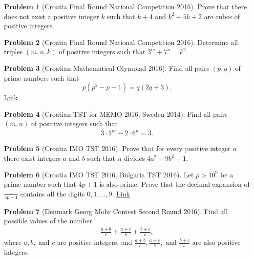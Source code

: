 \documentclass[]{article}
\theoremstyle{definition}
\newtheorem{problem}{Problem}
\begin{document}
\begin{problem}[Croatia Final Round National Competition 2016]
	Prove that there does not exist a positive integer $k$ such that $k + 4$ and $k^2 + 5k + 2$ are cubes of positive integers.
\end{problem}




\begin{problem}[Croatia Final Round National Competition 2016]
	Determine all triples $(m, n, k)$ of positive integers such that $3^m + 7^n = k^2$.
\end{problem}




\begin{problem}[Croatian Mathematical Olympiad 2016]
	Find all pairs $(p,q)$ of prime numbers such that
	$$ p(p^2 - p - 1) = q(2q + 3) .$$
	\flushright \href{http://artofproblemsolving.com/community/c6h1234390p6260615}{Link}
\end{problem}




\begin{problem}[Croatian TST for MEMO 2016, Sweden 2014]
	Find all pairs $(m, n)$ of positive integers such that
		\begin{align*}
			3 \cdot 5^m - 2\cdot 6^n = 3.
		\end{align*}
\end{problem}




\begin{problem}[Croatia IMO TST ‌2016]
	Prove that for every positive integer $n$ there exist integers $a$ and $b$ such that $n$ divides $4a^2 + 9b^2 - 1$.
\end{problem}



\begin{problem}[Croatia IMO TST 2016, Bulgaria TST 2016]
	Let $p > 10^9$ be a prime number such that $4p + 1$ is also prime.
	Prove that the decimal expansion of $\frac{1}{4p+1}$ contains all the digits $0,1, \ldots, 9$. \hfill \href{http://artofproblemsolving.com/community/c6h1233196p6246286}{Link}
\end{problem}




\begin{problem}[Denmark Georg Mohr Contest Second Round 2016]
	Find all possible values of the number
		\begin{align*}
			\frac{a+b}{c}+ \frac{a+c}{b}+ \frac{b+c}{a},
		\end{align*}
	where $a, b,$ and $c$ are positive integers, and $\frac{a+b}{c}, \frac{a+c}{b},$ and $\frac{b+c}{a}$ are also positive integers.
\end{problem}
\end{document}
